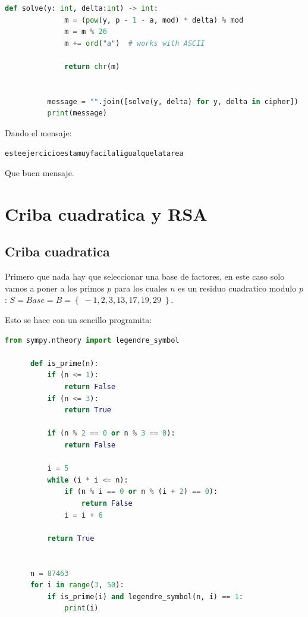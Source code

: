 \documentclass[12pt, fleqn]{report}                             %
\theoremstyle{break}                                            %
\newcommand{\Set}[1]            {\left\{ \; #1 \; \right\}}     %
\begin{document}
\begin{itemize}
\begin{lstlisting}[language=Python, gobble=10]
          def solve(y: int, delta:int) -> int:
              m = (pow(y, p - 1 - a, mod) * delta) % mod
              m = m % 26
              m += ord("a")  # works with ASCII

              return chr(m)


          message = "".join([solve(y, delta) for y, delta in cipher])
          print(message)
        \end{lstlisting}

        Dando el mensaje:
        \begin{lstlisting}[language=Python, gobble=10]
          esteejercicioestamuyfacilaligualquelatarea
        \end{lstlisting}

        Que buen mensaje.

      \end{itemize}

\chapter{Criba cuadratica y RSA}

  \section{Criba cuadratica}

    Primero que nada hay que seleccionar una base de factores, en este caso solo vamos a poner
    a los primos $p$ para los cuales $n$ es un residuo cuadratico modulo $p$:
    $S = Base = B = \Set{-1, 2, 3, 13, 17, 19, 29}$.

    Esto se hace con un sencillo programita:
    \begin{lstlisting}[language=Python, gobble=6]
      from sympy.ntheory import legendre_symbol

      def is_prime(n):
          if (n <= 1):
              return False
          if (n <= 3):
              return True

          if (n % 2 == 0 or n % 3 == 0):
              return False

          i = 5
          while (i * i <= n):
              if (n % i == 0 or n % (i + 2) == 0):
                  return False
              i = i + 6

          return True


      n = 87463
      for i in range(3, 50):
          if is_prime(i) and legendre_symbol(n, i) == 1:
              print(i)

    \end{lstlisting}
\end{document}
